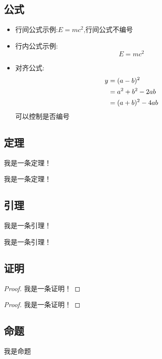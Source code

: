 \subsection{公式}
    \begin{itemize}
        \item 行间公式示例:$E=mc^2$,行间公式不编号
        \item 行内公式示例:\begin{equation}
            E=mc^2
        \end{equation}
        \item 对齐公式:\begin{align}
            y &=(a-b)^2\\
            &=a^2+b^2-2ab \notag\\
            &=(a+b)^2-4ab
        \end{align}
        可以控制是否编号 
    \end{itemize}
   
\subsection{定理}
    \begin{theorem}
        我是一条定理！
    \end{theorem}
    \begin{theorem}
        我是一条定理！
    \end{theorem}
\subsection{引理}
    \begin{lemma}
        我是一条引理！
    \end{lemma}
    \begin{lemma}
        我是一条引理！
    \end{lemma}
\subsection{证明}
    \begin{proof}
        我是一条证明！
    \end{proof}
    \begin{proof}
        我是一条证明！
    \end{proof}
\subsection{命题}
    \begin{props}
        我是命题
    \end{props}
